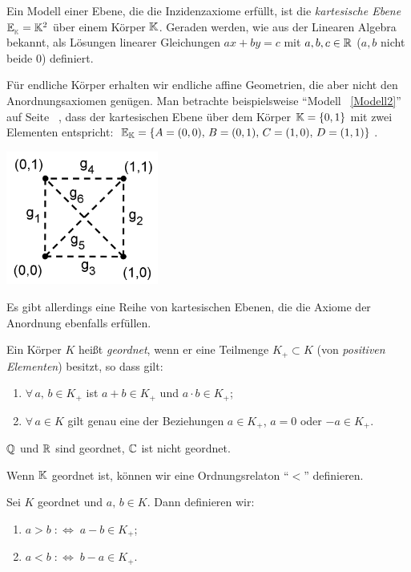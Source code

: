 Ein Modell einer Ebene, die die Inzidenzaxiome erfüllt, ist die {\em kartesische Ebene} $\mathbb E_{_\mathbb K} =
\mathbb K^2$ über einem Körper $\mathbb K$.  Geraden werden, wie aus der Linearen Algebra bekannt, als Lösungen
linearer Gleichungen $a x + b y = c$ mit $a, b, c \in \mathbb R$ ($a, b$ nicht beide $0$) definiert.

Für endliche Körper erhalten wir endliche affine Geometrien, die aber nicht den Anordnungsaxiomen
genügen. Man betrachte beispielsweise "`Modell ~\ref{Modell2}"' auf Seite ~\pageref{Modell2}, dass
der kartesischen Ebene über dem Körper $\mathbb K = \{0, 1\}$ mit zwei Elementen entspricht: $\mathbb E_{\mathbb K} = \{A
= (0,0),\, B = (0,1),\, C = (1,0),\, D = (1,1)\}$.

\centerline{\includegraphics[width=5cm]{BILDER/1-1-10-Modell2.png}}

Es gibt allerdings eine Reihe von kartesischen Ebenen, die die Axiome der Anordnung ebenfalls
erfüllen.

\begin{defi}
    Ein Körper $K$ heißt {\em geordnet}, wenn er eine Teilmenge $K_+\subset K$ (von {\em positiven
    Elementen}) besitzt, so dass gilt:
    \renewcommand{\labelenumi}{(\roman{enumi})} %
    \begin{enumerate}
        \item $\forall\, a,\, b \in K_+$ ist $a + b \in K_+$ und $a \cdot b \in K_+$;

        \item $\forall\, a \in K$ gilt genau eine der Beziehungen $a \in K_+$, $a = 0$ oder $-a \in
        K_+$.
    \end{enumerate}
\end{defi}

$\mathbb Q$ und $\mathbb R$ sind geordnet, $\mathbb C$ ist nicht geordnet.

Wenn $\mathbb K$ geordnet ist, können wir eine Ordnungsrelaton "`$<$"' definieren.

\begin{defi}
    Sei $K$ geordnet und $a,\, b \in K$. Dann definieren wir:
    \begin{enumerate}
        \item $a > b\;: \Longleftrightarrow\; a - b \in K_+$;

        \item $a < b\;: \Longleftrightarrow\; b - a\in K_+$.
    \end{enumerate}
\end{defi}

